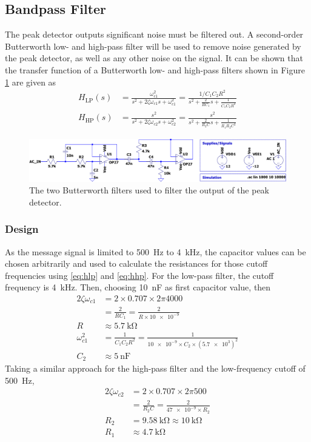 \documentclass[11pt,letter,notitlepage]{article}
\begin{document}
	\subsection{Bandpass Filter}
	The peak detector outputs significant noise must be filtered out. A second-order Butterworth low- and high-pass filter will be used to remove noise generated by the peak detector, as well as any other noise on the signal. It can be shown\cite{nilssonriedel} that the transfer function of a Butterworth low- and high-pass filters shown in Figure \ref{fig:bpfckt-crop} are given as \begin{align}
		H_\mathrm{LP}(s) & = \frac{\omega_{c1} ^2}{s^2 + 2 \zeta \omega_{c1} s + \omega_{c1}^2} = \frac{ 1 / C_1 C_2 R^2 }{s^2 + \frac{2}{R C_1}s + \frac{1}{C_1 C_2 R^2}} \label{eq:hlp} \\
		H_\mathrm{HP}(s) & = \frac{s^2}{s^2 + 2 \zeta \omega_{c2} s + \omega_{c2}^2} = \frac{s^2}{s^2 + \frac{2}{R_2 C} s + \frac{1}{R_1 R_2 C^2}} \label{eq:hhp}
	\end{align}
	
	\begin{figure}[h]
		\centering
		\includegraphics[width=1\linewidth]{bpf/bpfckt-crop}
		\caption{The two Butterworth filters used to filter the output of the peak detector.}
		\label{fig:bpfckt-crop}
	\end{figure}

	\subsubsection{Design}
	As the message signal is limited to \SI{500}{\Hz} to \SI{4}{\kHz}, the capacitor values can be chosen arbitrarily and used to calculate the resistances for those cutoff frequencies using \eqref{eq:hlp} and \eqref{eq:hhp}. For the low-pass filter, the cutoff frequency is \SI{4}{\kHz}. Then, choosing \SI{10}{\nano\farad} as first capacitor value, then \begin{align*}
		2 \zeta \omega_{c1} & = 2 \times 0.707 \times 2 \pi 4000 \\
			& = \frac{2}{R C_1} = \frac{2}{R \times \num{10e-9}} \\
		R & \approx \SI{5.7}{\kohm} \\
		\omega_{c1}^2 & = \frac{1}{C_1 C_2 R^2} = \frac{1}{\num{10e-9} \times C_2 \times \left(\num{5.7e3}\right)^2} \\
		C_2 & \approx \SI{5}{\nano\farad}
	\end{align*}
	Taking a similar approach for the high-pass filter and the low-frequency cutoff of \SI{500}{\Hz}, \begin{align*}
		2 \zeta \omega_{c2} & = 2 \times 0.707 \times 2 \pi 500 \\
			& = \frac{2}{R_2 C} = \frac{2}{\num{47e-9} \times R_2} \\
		R_2 & = \SI{9.58}{\kohm} \approx \SI{10}{\kohm} \\
		R_1 & \approx \SI{4.7}{\kohm}
	\end{align*}
	
\end{document}
